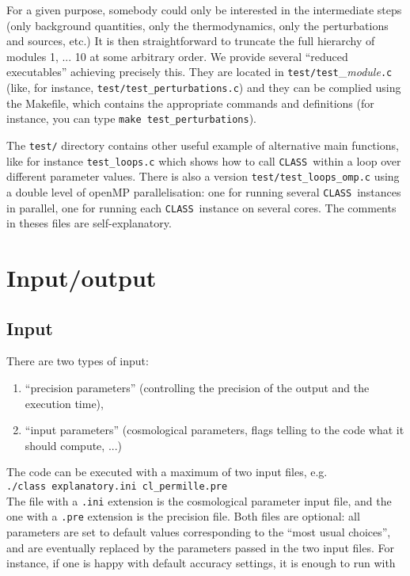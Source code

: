\documentclass{article}
\newcommand\CLASS{{\tt CLASS}~}
\begin{document}
For a given purpose, somebody could only be interested in the
intermediate steps (only background quantities, only the
thermodynamics, only the perturbations and sources, etc.) It is
then straightforward to truncate the full hierarchy of modules 1, ... 10 at some
arbitrary order. We provide several ``reduced executables'' achieving precisely this.
They are located in {\tt test/test}\_{\it module}{\tt.c} (like, for instance, {\tt test/test\_perturbations.c}) and they can
be complied using the Makefile, which contains the appropriate commands and definitions (for instance, you can type {\tt make test\_perturbations}).

The {\tt test/} directory contains other useful example of alternative main functions, like for instance
{\tt test\_loops.c} which shows how to call \CLASS within a loop over different parameter values.
There is also a version {\tt test/test\_loops\_omp.c} using a double level of openMP parallelisation: one for running several \CLASS instances in parallel, one for running each \CLASS instance on several cores. The comments in theses files are self-explanatory.

\section{Input/output}

\subsection{Input}

There are two types of input:
\begin{enumerate}
\item ``precision parameters'' (controlling the precision of the output and the execution time),
\item ``input parameters'' (cosmological parameters, flags telling to the code what it should compute, ...)
\end{enumerate}
The code can be executed with a maximum of two input files, e.g.\\

\indent 
{\tt ./class explanatory.ini cl\_permille.pre}\\


\noindent
The file with a {\tt .ini} extension is the cosmological parameter
input file, and the one with a {\tt .pre} extension is the precision
file. Both files are optional: all parameters are set to default
values corresponding to the ``most usual choices'', and are eventually
replaced by the parameters passed in the two input files. For
instance, if one is happy with default accuracy settings, it is enough
to run with \\
\end{document}
